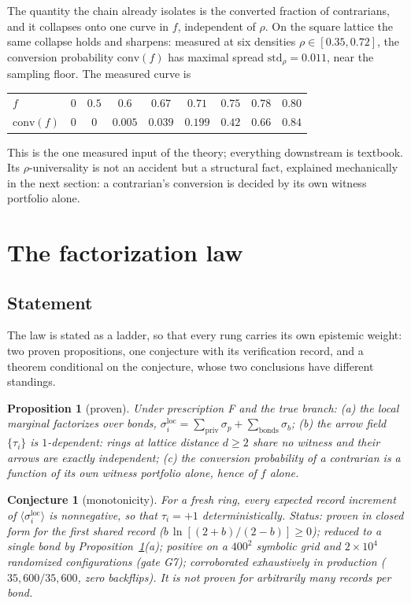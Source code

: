 \documentclass[11pt]{article}
\newtheorem{proposition}{Proposition}
\newtheorem{conjecture}{Conjecture}
\newcommand{\conv}{\mathrm{conv}}
\begin{document}
The quantity the chain already isolates is the converted fraction of
contrarians, and it collapses onto one curve in $f$, independent of $\rho$.
On the square lattice the same collapse holds and sharpens: measured at six
densities $\rho \in [0.35, 0.72]$, the conversion probability $\conv(f)$ has
maximal spread $\mathrm{std}_\rho = 0.011$, near the sampling floor. The measured
curve is
%
\begin{center}
\begin{tabular}{lcccccccc}
\toprule
$f$ & $0$ & $0.5$ & $0.6$ & $0.67$ & $0.71$ & $0.75$ & $0.78$ & $0.80$ \\
$\conv(f)$ & $0$ & $0$ & $0.005$ & $0.039$ & $0.199$ & $0.42$ & $0.66$ & $0.84$ \\
\bottomrule
\end{tabular}
\end{center}
%
This is the one measured input of the theory; everything downstream is
textbook. Its $\rho$-universality is not an accident but a structural fact,
explained mechanically in the next section: a contrarian's conversion is
decided by its own witness portfolio alone.

\section{The factorization law}
\label{sec:factorization}

\subsection{Statement}

The law is stated as a ladder, so that every rung carries its own
epistemic weight: two proven propositions, one conjecture with its
verification record, and a theorem conditional on the conjecture, whose two
conclusions have different standings.

\begin{proposition}[proven]
\label{prop:structure}
Under prescription F and the true branch: (a) the local marginal
factorizes over bonds,
$\sigma_i^{\mathrm{loc}} = \sum_{\mathrm{priv}} \sigma_p +
\sum_{\mathrm{bonds}} \sigma_b$; (b) the arrow field $\{\tau_i\}$ is
$1$-dependent: rings at lattice distance $d \ge 2$ share no witness and
their arrows are exactly independent; (c) the conversion probability of a
contrarian is a function of its own witness portfolio alone, hence of $f$
alone.
\end{proposition}

\begin{conjecture}[monotonicity]
\label{conj:mono}
For a fresh ring, every expected record increment of
$\langle\sigma_i^{\mathrm{loc}}\rangle$ is nonnegative, so that
$\tau_i = +1$ deterministically. Status: proven in closed form for the
first shared record ($b\,\ln[(2+b)/(2-b)] \ge 0$); reduced to a single
bond by Proposition~\ref{prop:structure}(a); positive on a $400^2$
symbolic grid and $2\times 10^4$ randomized configurations (gate G7);
corroborated exhaustively in production ($35{,}600/35{,}600$, zero
backflips). It is not proven for arbitrarily many records per bond.
\end{conjecture}
\end{document}

